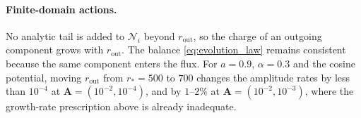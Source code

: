 \paragraph{Finite-domain actions.} No analytic tail is added to $\mathcal{N}_i$ beyond $r_\mathrm{out}$, so the charge of an outgoing component grows with $r_\mathrm{out}$. The balance \eqref{eq:evolution_law} remains consistent because the same component enters the flux. For $a=0.9$, $\alpha=0.3$ and the cosine potential, moving $r_\mathrm{out}$ from $r_*=500$ to $700$ changes the amplitude rates by less than $10^{-4}$ at $\mathbf A=(10^{-2},10^{-4})$, and by $1$--$2\%$ at $\mathbf A=(10^{-2},10^{-3})$, where the growth-rate prescription above is already inadequate.

